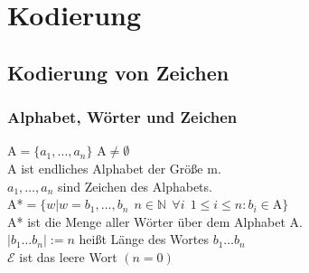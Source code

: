 \documentclass{scrartcl}[10pt]
\begin{document}
\section{Kodierung}
\subsection{Kodierung von Zeichen}
\subsubsection{Alphabet, W\"orter und Zeichen}
A$= \{a_1, \dots, a_n\}$ A$\neq \emptyset$\\
A ist endliches Alphabet der Gr\"o\ss e m.\\
$a_1,\dots, a_n$ sind Zeichen des Alphabets.\\
A*$= \{w|w=b_1,\dots,b_n \ \ n \in \mathbb{N} \ \ \forall i \ \ 1 \leq i \leq n: b_i \in \text{A}\}$\\
A* ist die Menge aller W\"orter \"uber dem Alphabet A.\\
$|b_1 \dots b_n| := n$ hei\ss t L\"ange des Wortes $b_1 \dots b_n$\\
$ \mathcal{E} $ ist das leere Wort $(n = 0)$
\end{document}
